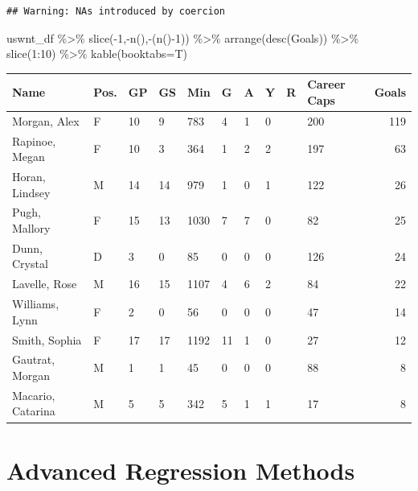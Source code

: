 \documentclass[
  11pt,
]{book}
\newenvironment{Shaded}{\begin{snugshade}}{\end{snugshade}}
\newcommand{\AttributeTok}[1]{\textcolor[rgb]{0.77,0.63,0.00}{#1}}
\newcommand{\DecValTok}[1]{\textcolor[rgb]{0.00,0.00,0.81}{#1}}
\newcommand{\FunctionTok}[1]{\textcolor[rgb]{0.00,0.00,0.00}{#1}}
\newcommand{\NormalTok}[1]{#1}
\newcommand{\SpecialCharTok}[1]{\textcolor[rgb]{0.00,0.00,0.00}{#1}}
\theoremstyle{definition}
\theoremstyle{definition}
\theoremstyle{definition}
\theoremstyle{definition}
\theoremstyle{remark}
\begin{document}
\begin{verbatim}
## Warning: NAs introduced by coercion
\end{verbatim}

\begin{Shaded}
\begin{Highlighting}[]
\NormalTok{uswnt\_df }\SpecialCharTok{\%\textgreater{}\%} 
  \FunctionTok{slice}\NormalTok{(}\SpecialCharTok{{-}}\DecValTok{1}\NormalTok{,}\SpecialCharTok{{-}}\FunctionTok{n}\NormalTok{(),}\SpecialCharTok{{-}}\NormalTok{(}\FunctionTok{n}\NormalTok{()}\SpecialCharTok{{-}}\DecValTok{1}\NormalTok{)) }\SpecialCharTok{\%\textgreater{}\%} 
  \FunctionTok{arrange}\NormalTok{(}\FunctionTok{desc}\NormalTok{(Goals)) }\SpecialCharTok{\%\textgreater{}\%} 
  \FunctionTok{slice}\NormalTok{(}\DecValTok{1}\SpecialCharTok{:}\DecValTok{10}\NormalTok{) }\SpecialCharTok{\%\textgreater{}\%} 
  \FunctionTok{kable}\NormalTok{(}\AttributeTok{booktabs=}\NormalTok{T)}
\end{Highlighting}
\end{Shaded}

\begin{tabular}{llllllllllr}
\toprule
Name & Pos. & GP & GS & Min & G & A & Y & R & Career Caps & Goals\\
\midrule
Morgan, Alex & F & 10 & 9 & 783 & 4 & 1 & 0 &  & 200 & 119\\
Rapinoe, Megan & F & 10 & 3 & 364 & 1 & 2 & 2 &  & 197 & 63\\
Horan, Lindsey & M & 14 & 14 & 979 & 1 & 0 & 1 &  & 122 & 26\\
Pugh, Mallory & F & 15 & 13 & 1030 & 7 & 7 & 0 &  & 82 & 25\\
Dunn, Crystal & D & 3 & 0 & 85 & 0 & 0 & 0 &  & 126 & 24\\
\addlinespace
Lavelle, Rose & M & 16 & 15 & 1107 & 4 & 6 & 2 &  & 84 & 22\\
Williams, Lynn & F & 2 & 0 & 56 & 0 & 0 & 0 &  & 47 & 14\\
Smith, Sophia & F & 17 & 17 & 1192 & 11 & 1 & 0 &  & 27 & 12\\
Gautrat, Morgan & M & 1 & 1 & 45 & 0 & 0 & 0 &  & 88 & 8\\
Macario, Catarina & M & 5 & 5 & 342 & 5 & 1 & 1 &  & 17 & 8\\
\bottomrule
\end{tabular}

\hypertarget{advanced-regression-methods}{%
\chapter{Advanced Regression Methods}\label{advanced-regression-methods}}
\end{document}
